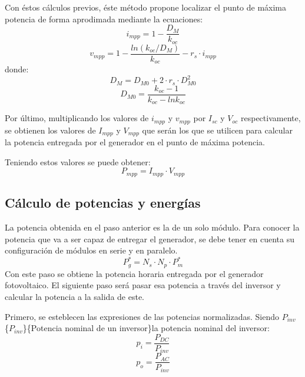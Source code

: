 Con éstos cálculos previos, éste método propone localizar el punto de máxima potencia de forma aprodimada mediante la ecuaciones:
\begin{equation}
i_{mpp}=1-\frac{D_M}{k_{oc}}
\end{equation}
\begin{equation}
v_{mpp}=1-\frac{ln(k_{oc}/D_M)}{k_{oc}}-r_s\cdot i_{mpp}
\end{equation}
donde:
\begin{equation}
D_M=D_{M0}+2\cdot r_s\cdot D_{M0}^2
\end{equation}
\begin{equation}
D_{M0}=\frac{k_{oc}-1}{k_{oc}-lnk_{oc}}
\end{equation}

Por último, multiplicando los valores de \(i_{mpp}\) y \(v_{mpp}\) por \(I_{sc}\) y \(V_{oc}\) respectivamente, se obtienen los valores de \(I_{mpp}\) y \(V_{mpp}\) que serán los que se utilicen para calcular la potencia entregada por el generador en el punto de máxima potencia.

Teniendo estos valores se puede obtener:
\begin{equation}
P_{mpp}=I_{mpp}\cdot V_{mpp}
\end{equation}

\subsection{Cálculo de potencias y energías}
\label{sec:org03b3fa4}
\label{subsec:calculo-potencias-energias}
La potencia obtenida en el paso anterior es la de un solo módulo. Para conocer la potencia que va a ser capaz de entregar el generador, se debe tener en cuenta su configuración de módulos en serie y en paralelo.
\begin{equation}
P_g^*=N_s\cdot N_p\cdot P_m^*
\end{equation}
Con este paso se obtiene la potencia horaria entregada por el generador fotovoltaico. El siguiente paso será pasar esa potencia a través del inversor y calcular la potencia a la salida de este.

Primero, se esteblecen las expresiones de las potencias normalizadas. Siendo \(P_{inv}\) \nomenclature[Pinv]\{\(P_{inv}\)\}\{Potencia nominal de un inversor\}la potencia nominal del inversor:
\begin{equation}
p_i=\frac{P_{DC}}{P_{inv}}
\end{equation}
\begin{equation}
p_o=\frac{P_{AC}}{P_{inv}}
\end{equation}

